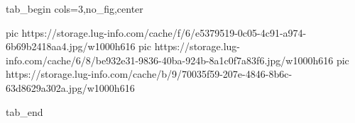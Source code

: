  
 
 
 
 


\ifcmt
  tab_begin cols=3,no_fig,center

     pic https://storage.lug-info.com/cache/f/6/e5379519-0c05-4c91-a974-6b69b2418aa4.jpg/w1000h616%
		 pic https://storage.lug-info.com/cache/6/8/be932e31-9836-40ba-924b-8a1c0f7a83f6.jpg/w1000h616%
		 pic https://storage.lug-info.com/cache/b/9/70035f59-207e-4846-8b6c-63d8629a302a.jpg/w1000h616%

  tab_end
\fi
